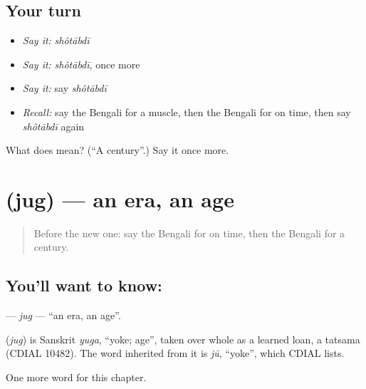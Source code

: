 \subsection*{Your turn}
\begin{itemize}
\raggedright
  \item \emph{Say it:} \emph{shôtābdī}
  \item \emph{Say it:} \emph{shôtābdī}, once more
  \item \emph{Say it:} say \emph{shôtābdī}
  \item \emph{Recall:} say the Bengali for a muscle, then the Bengali for on time, then say \emph{shôtābdī} again
\end{itemize}

\begin{tcolorbox}[breakable,colback=teal!4,colframe=teal!35!black,title={Before you move on}]
What does  mean? (\textquotedblleft{}A century\textquotedblright{}.) Say it once more.
\end{tcolorbox}
\section[\texorpdfstring{\bn{যুগ} (jug)}{যুগ (jug)}]{ (jug) — an era, an age}

\label{lesson:BN-C187-jug}



\begin{quote}
Before the new one: say the Bengali for on time, then the Bengali for a century.
\end{quote}

\subsection*{You'll want to know: }
\textbf{} — \emph{jug} — \textquotedblleft{}an era, an age\textquotedblright{}.

\begin{cousinweb}
\textbf{} (\emph{jug}) is Sanskrit \emph{yuga}, \textquotedblleft{}yoke; age\textquotedblright{}, taken over whole as a learned loan, a tatsama (CDIAL 10482). The word inherited from it is \emph{jū}, \textquotedblleft{}yoke\textquotedblright{}, which CDIAL lists.
\end{cousinweb}

\begin{grammarlens}[title={What you've built}]
One more word for this chapter.
\end{grammarlens}

